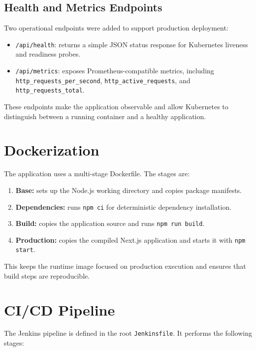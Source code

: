 \documentclass[12pt,a4paper]{article}
\begin{document}
\subsection{Health and Metrics Endpoints}

Two operational endpoints were added to support production deployment:

\begin{itemize}[leftmargin=*]
    \item \texttt{/api/health}: returns a simple JSON status response for Kubernetes liveness and readiness probes.
    \item \texttt{/api/metrics}: exposes Prometheus-compatible metrics, including \texttt{http\_requests\_per\_second}, \texttt{http\_active\_requests}, and \texttt{http\_requests\_total}.
\end{itemize}

These endpoints make the application observable and allow Kubernetes to
distinguish between a running container and a healthy application.

\section{Dockerization}

The application uses a multi-stage Dockerfile. The stages are:

\begin{enumerate}[leftmargin=*]
    \item \textbf{Base:} sets up the Node.js working directory and copies package manifests.
    \item \textbf{Dependencies:} runs \texttt{npm ci} for deterministic dependency installation.
    \item \textbf{Build:} copies the application source and runs \texttt{npm run build}.
    \item \textbf{Production:} copies the compiled Next.js application and starts it with \texttt{npm start}.
\end{enumerate}

This keeps the runtime image focused on production execution and ensures that
build steps are reproducible.

\section{CI/CD Pipeline}

The Jenkins pipeline is defined in the root \texttt{Jenkinsfile}. It performs
the following stages:
\end{document}
